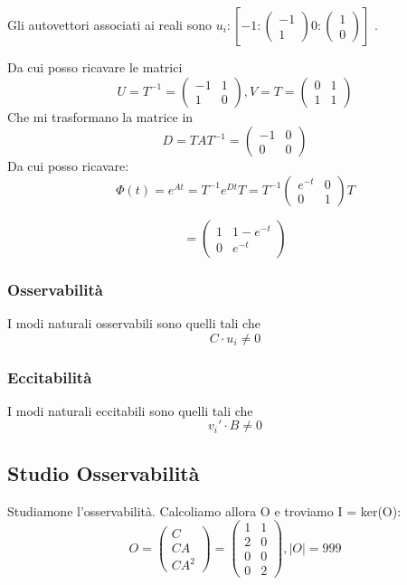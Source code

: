 \documentclass{article}
\begin{document}
Gli autovettori associati ai reali sono $ u_i: [  -1: \left(\begin{matrix}-1\\1\end{matrix}\right)0: \left(\begin{matrix}1\\0\end{matrix}\right) ]$
.

Da cui posso ricavare le matrici \[U=T^{-1} = \left(\begin{matrix}-1 & 1\\1 & 0\end{matrix}\right), V = T = \left(\begin{matrix}0 & 1\\1 & 1\end{matrix}\right)\]
Che mi trasformano la matrice in \[ D = TAT^{-1} = \left(\begin{matrix}-1 & 0\\0 & 0\end{matrix}\right) \]
Da cui posso ricavare: \[ \Phi(t) = e^{At} = T^{-1} e^{Dt} T =  T^{-1} \left(\begin{matrix}e^{- t} & 0\\0 & 1\end{matrix}\right) T\]

\[ = \left(\begin{matrix}1 & 1 - e^{- t}\\0 & e^{- t}\end{matrix}\right) \]\subsubsection{Osservabilità}
 I modi naturali osservabili sono quelli tali che 
\[ C \cdot u_i   \neq 0\]
\subsubsection{Eccitabilità}
 I modi naturali eccitabili sono quelli tali che 
\[v_i' \cdot B \neq 0\]

\subsection{Studio Osservabilità}

Studiamone l’osservabilità. Calcoliamo allora O e troviamo I = ker(O):
\[
 O = \begin{pmatrix}C \\ CA \\ CA^2 \end{pmatrix} = \left(\begin{matrix}1 & 1\\2 & 0\\0 & 0\\0 & 2\end{matrix}\right), |O| = 999 \]
\end{document}
